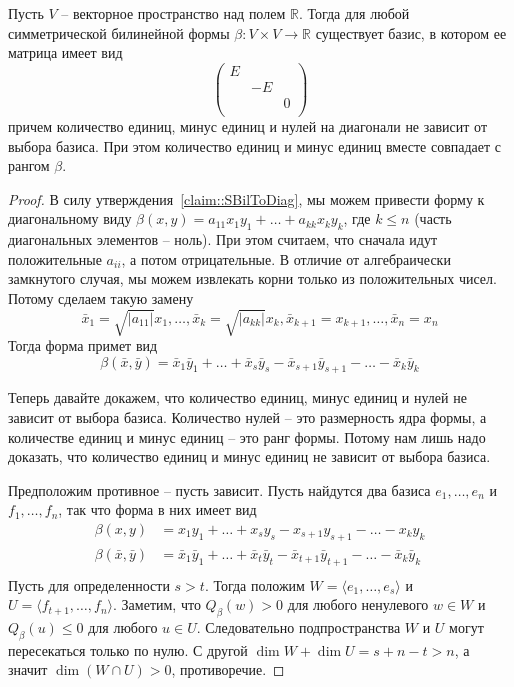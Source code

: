 \begin{claim}\label{claim::SBilReal}
Пусть $V$ -- векторное пространство над полем $\mathbb R$. Тогда для любой симметрической билинейной формы $\beta\colon V\times V\to \mathbb R$ существует базис, в котором ее матрица имеет вид
\[
\begin{pmatrix}
{E}&{}&{}\\
{}&{-E}&{}\\
{}&{}&{0}\\
\end{pmatrix}
\]
причем количество единиц, минус единиц и нулей на диагонали не зависит от выбора базиса. При этом количество единиц и минус единиц вместе совпадает с рангом $\beta$.
\end{claim}
\begin{proof}
В силу утверждения~\ref{claim::SBilToDiag}, мы можем привести форму к диагональному виду $\beta(x,y) = a_{11}x_1 y_1 + \ldots + a_{kk}x_ky_k$, где $k\leqslant n$ (часть диагональных элементов -- ноль). При этом считаем, что сначала идут положительные $a_{ii}$, а потом отрицательные. В отличие от алгебраически замкнутого случая, мы можем извлекать корни только из положительных чисел. Потому сделаем такую замену
\[
\bar x_1 = \sqrt{|a_{11}|} x_1,\ldots,\bar x_k = \sqrt{|a_{kk}|} x_k, \bar x_{k+1} = x_{k+1},\ldots,\bar x_n = x_n
\]
Тогда форма примет вид 
\[
\beta(\bar x,\bar y) = \bar x_1\bar y_1+\ldots +\bar x_s \bar y_s - \bar x_{s+1}\bar y_{s+1} - \ldots - \bar x_k \bar y_k
\]

Теперь давайте докажем, что количество единиц, минус единиц и нулей не зависит от выбора базиса. Количество нулей -- это размерность ядра формы, а количестве единиц и минус единиц -- это ранг формы. Потому нам лишь надо доказать, что количество единиц и минус единиц не зависит от выбора базиса.

Предположим противное -- пусть зависит. Пусть найдутся два базиса $e_1,\ldots,e_n$ и $f_1,\ldots,f_n$, так что форма в них имеет вид
\begin{align*}
\beta(x, y) &= x_1y_1+\ldots +x_s y_s - x_{s+1}y_{s+1} - \ldots - x_k y_k\\
\beta(\bar x,\bar  y) &= \bar x_1\bar y_1+\ldots +\bar x_t \bar y_t - \bar x_{t+1}\bar y_{t+1} - \ldots - \bar x_k \bar y_k\\
\end{align*}
Пусть для определенности $s > t$. Тогда положим $W = \langle e_1,\ldots, e_s\rangle$ и $U = \langle f_{t+1},\ldots, f_n\rangle$. Заметим, что $Q_\beta(w) > 0$ для любого ненулевого $w\in W$ и $Q_\beta(u) \leqslant 0$ для любого $u\in U$. Следовательно подпространства $W$ и $U$ могут пересекаться только по нулю. С другой $\dim W+\dim U = s + n - t > n$, а значит $\dim(W\cap U) > 0$, противоречие.
\end{proof}

